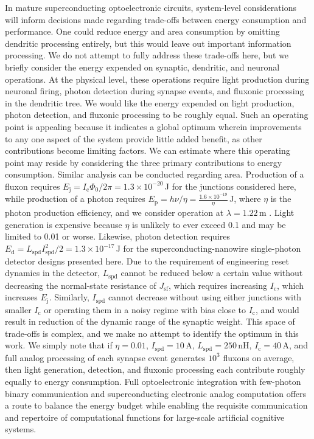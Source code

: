 \documentclass[twocolumn]{article}
\begin{document}
In mature superconducting optoelectronic circuits, system-level considerations will inform decisions made regarding trade-offs between energy consumption and performance. One could reduce energy and area consumption by omitting dendritic processing entirely, but this would leave out important information processing. We do not attempt to fully address these trade-offs here, but we briefly consider the energy expended on synaptic, dendritic, and neuronal operations. At the physical level, these operations require light production during neuronal firing, photon detection during synapse events, and fluxonic processing in the dendritic tree. We would like the energy expended on light production, photon detection, and fluxonic processing to be roughly equal. Such an operating point is appealing because it indicates a global optimum wherein improvements to any one aspect of the system provide little added benefit, as other contributions become limiting factors. We can estimate where this operating point may reside by considering the three primary contributions to energy consumption. Similar analysis can be conducted regarding area. Production of a fluxon requires $E_{\mathrm{j}} = I_{\mathrm{c}}\Phi_0/2\pi = 1.3\times 10^{-20}$\,J for the junctions considered here, while production of a photon requires $E_{\mathrm{p}} = h\nu/\eta = \frac{1.6\times 10^{-19}}{\eta}$\,J, where $\eta$ is the photon production efficiency, and we consider operation at $\lambda = 1.22$\,\textmu m \cite{buch2017}. Light generation is expensive because $\eta$ is unlikely to ever exceed 0.1 and may be limited to 0.01 or worse. Likewise, photon detection requires $E_{\mathrm{d}} = L_{\mathrm{spd}}I_{\mathrm{spd}}^2/2 = 1.3\times 10^{-17}$\,J for the superconducting-nanowire single-photon detector designs presented here. Due to the requirement of engineering reset dynamics in the detector, $L_{\mathrm{spd}}$ cannot be reduced below a certain value without decreasing the normal-state resistance of $J_{\mathrm{sf}}$, which requires increasing $I_{\mathrm{c}}$, which increases $E_{\mathrm{j}}$. Similarly, $I_{\mathrm{spd}}$ cannot decrease without using either junctions with smaller $I_{\mathrm{c}}$ or operating them in a noisy regime with bias close to $I_{\mathrm{c}}$, and would result in reduction of the dynamic range of the synaptic weight. This space of trade-offs is complex, and we make no attempt to identify the optimum in this work. We simply note that if $\eta = 0.01$, $I_{\mathrm{spd}} = 10$\,\textmu A, $L_{\mathrm{spd}} = 250$\,nH, $I_{\mathrm{c}} = 40$\,\textmu A, and full analog processing of each synapse event generates $10^3$ fluxons on average, then light generation, detection, and fluxonic processing each contribute roughly equally to energy consumption. Full optoelectronic integration with few-photon binary communication and superconducting electronic analog computation offers a route to balance the energy budget while enabling the requisite communication and repertoire of computational functions for large-scale artificial cognitive systems.
\end{document}
